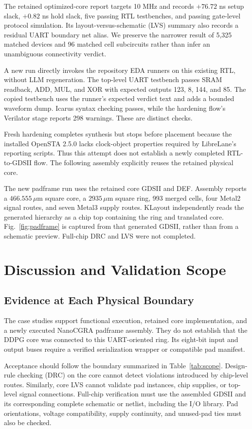 ﻿\documentclass[conference,letterpaper]{IEEEtran}
\begin{document}
The retained optimized-core report targets 10 MHz and records $+76.72$ ns setup slack, $+0.82$ ns hold slack, five passing RTL testbenches, and passing gate-level protocol simulation. Its layout-versus-schematic (LVS) summary also records a residual UART boundary net alias. We preserve the narrower result of 5,325 matched devices and 96 matched cell subcircuits rather than infer an unambiguous connectivity verdict.

A new run directly invokes the repository EDA runners on this existing RTL, without LLM regeneration. The top-level UART testbench passes SRAM readback, ADD, MUL, and XOR with expected outputs 123, 8, 144, and 85. The copied testbench uses the runner's expected verdict text and adds a bounded waveform dump. Icarus syntax checking passes, while the hardening flow's Verilator stage reports 298 warnings. These are distinct checks.

Fresh hardening completes synthesis but stops before placement because the installed OpenSTA 2.5.0 lacks clock-object properties required by LibreLane's reporting scripts. Thus this attempt does not establish a newly completed RTL-to-GDSII flow. The following assembly explicitly reuses the retained physical core.

The new padframe run uses the retained core GDSII and DEF. Assembly reports a $466.555\,\mu$m square core, a $2935\,\mu$m square ring, 993 merged cells, four Metal2 signal routes, and seven Metal3 supply routes. KLayout independently reads the generated hierarchy as a chip top containing the ring and translated core. Fig.~\ref{fig:padframe} is captured from that generated GDSII, rather than from a schematic preview. Full-chip DRC and LVS were not completed.

\section{Discussion and Validation Scope}
\subsection{Evidence at Each Physical Boundary}
The case studies support functional execution, retained core implementation, and a newly executed NanoCGRA padframe assembly. They do not establish that the DDPG core was connected to this UART-oriented ring. Its eight-bit input and output buses require a verified serialization wrapper or compatible pad manifest.

Acceptance should follow the boundary summarized in Table~\ref{tab:scope}. Design-rule checking (DRC) on the core cannot detect violations introduced by chip-level routes. Similarly, core LVS cannot validate pad instances, chip supplies, or top-level signal connections. Full-chip verification must use the assembled GDSII and its corresponding complete schematic or netlist, including the I/O library. Pad orientations, voltage compatibility, supply continuity, and unused-pad ties must also be checked.
\end{document}
